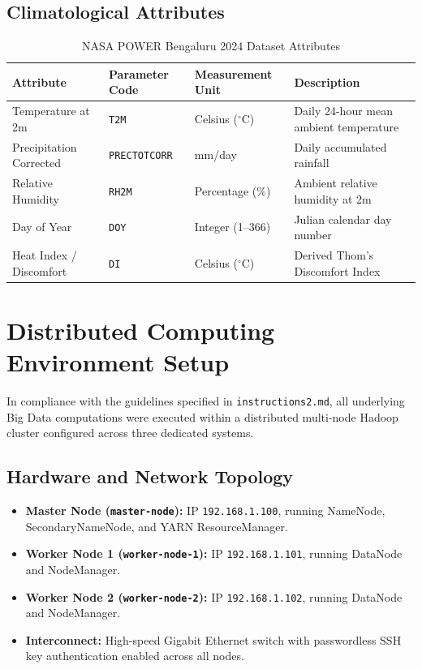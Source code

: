 \documentclass[12pt,a4paper]{article}
\begin{document}
\subsection{Climatological Attributes}
\begin{table}[H]
\centering
\small
\begin{tabular}{llll}
\toprule
\textbf{Attribute} & \textbf{Parameter Code} & \textbf{Measurement Unit} & \textbf{Description} \\
\midrule
Temperature at 2m & \texttt{T2M} & Celsius ($^\circ\text{C}$) & Daily 24-hour mean ambient temperature \\
Precipitation Corrected & \texttt{PRECTOTCORR} & mm/day & Daily accumulated rainfall \\
Relative Humidity & \texttt{RH2M} & Percentage (\%) & Ambient relative humidity at 2m \\
Day of Year & \texttt{DOY} & Integer (1--366) & Julian calendar day number \\
Heat Index / Discomfort & \texttt{DI} & Celsius ($^\circ\text{C}$) & Derived Thom's Discomfort Index \\
\bottomrule
\end{tabular}
\caption{NASA POWER Bengaluru 2024 Dataset Attributes}
\end{table}

\section{Distributed Computing Environment Setup}

In compliance with the guidelines specified in \texttt{instructions2.md}, all underlying Big Data computations were executed within a distributed multi-node Hadoop cluster configured across three dedicated systems.

\subsection{Hardware and Network Topology}
\begin{itemize}
    \item \textbf{Master Node (\texttt{master-node}):} IP \texttt{192.168.1.100}, running NameNode, SecondaryNameNode, and YARN ResourceManager.
    \item \textbf{Worker Node 1 (\texttt{worker-node-1}):} IP \texttt{192.168.1.101}, running DataNode and NodeManager.
    \item \textbf{Worker Node 2 (\texttt{worker-node-2}):} IP \texttt{192.168.1.102}, running DataNode and NodeManager.
    \item \textbf{Interconnect:} High-speed Gigabit Ethernet switch with passwordless SSH key authentication enabled across all nodes.
\end{itemize}
\end{document}
